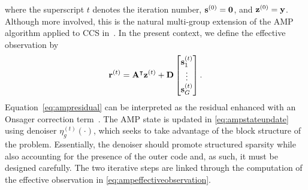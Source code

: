 \documentclass[journal]{IEEEtran}
\begin{document}
where the superscript $t$ denotes the iteration number, $\mathbf{s}^{(0)} = \mathbf{0}$, and $\mathbf{z}^{(0)} = \mathbf{y}$.
Although more involved, this is the natural multi-group extension of the AMP algorithm applied to CCS in~\cite{amalladinne2020unsourced}.
In the present context, we define the effective observation by
\begin{equation}
    \label{eq:ampeffectiveobservation}
    \mathbf{r}^{(t)} = \mathbf{A}^\intercal \mathbf{z}^{(t)}
    + \mathbf{D} \begin{bmatrix} \mathbf{s}_1^{(t)} \\ \vdots \\ \mathbf{s}_G^{(t)} \\ \end{bmatrix}.
\end{equation}
Equation~\eqref{eq:ampresidual} can be interpreted as the residual enhanced with an Onsager correction term~\cite{bayati2011dynamics, donoho2013information}.
The AMP state is updated in \eqref{eq:ampstateupdate} using denoiser $\eta_g^{(t)}(\cdot)$, which seeks to take advantage of the block structure of the problem.
Essentially, the denoiser should promote structured sparsity while also accounting for the presence of the outer code and, as such, it must be designed carefully.
The two iterative steps are linked through the computation of the effective observation in \eqref{eq:ampeffectiveobservation}.
\end{document}
